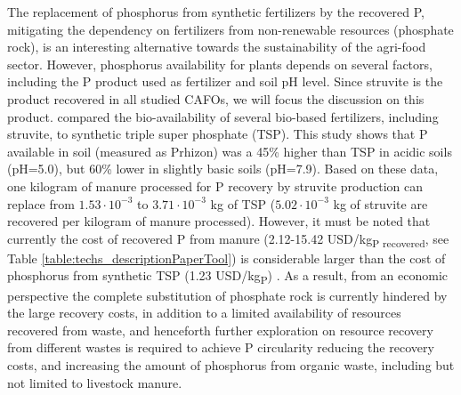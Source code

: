 \begin{refsection}[referencesCh4]
The replacement of phosphorus from synthetic fertilizers by the recovered P, mitigating the dependency on fertilizers from non-renewable resources (phosphate rock), is an interesting alternative towards the sustainability of the agri-food sector. However, phosphorus availability for plants depends on several factors, including the P product used as fertilizer and soil pH level. Since struvite is the product recovered in all studied CAFOs, we will focus the discussion on this product.
\citet{vaneeckhaute2015efficiency} compared the bio-availability of several bio-based fertilizers, including struvite, to synthetic triple super phosphate (TSP). This study shows that P available in soil (measured as Prhizon) was a 45\% higher than TSP in acidic soils (pH=5.0), but 60\% lower in slightly basic soils (pH=7.9). Based on these data, one kilogram of manure processed for P recovery by struvite production can replace from $1.53\cdot 10^{-3}$ to $3.71\cdot 10^{-3}$ kg of TSP ($5.02 \cdot 10^{-3}$ kg of struvite are recovered per kilogram of manure processed). However, it must be noted that currently the cost of recovered P from manure (2.12-15.42 USD/kg\textsubscript{P recovered}, see Table \ref{table:techs_descriptionPaperTool}) is considerable larger than the cost of phosphorus from synthetic TSP (1.23  USD/kg\textsubscript{P}) \citep{fertilizers_price}. As a result, from an economic perspective the complete substitution of phosphate rock is currently hindered by the large recovery costs, in addition to a limited availability of resources recovered from waste, and henceforth further exploration on resource recovery from different wastes is required to achieve P circularity reducing the recovery costs, and increasing the amount of phosphorus from organic waste, including but not limited to livestock manure.


\end{refsection}
